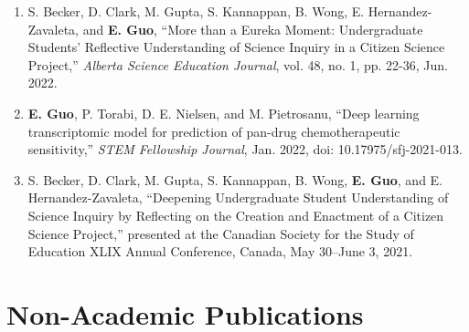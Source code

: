 \documentclass{article}
\begin{document}
\begin{enumerate}[itemsep=1em]
    \item S. Becker, D. Clark, M. Gupta, S. Kannappan, B. Wong, E. Hernandez-Zavaleta, and \textbf{E. Guo}, ``More than a Eureka Moment: Undergraduate Students' Reflective Understanding of Science Inquiry in a Citizen Science Project,'' \textit{Alberta Science Education Journal}, vol. 48, no. 1, pp. 22-36, Jun. 2022.
    \item \textbf{E. Guo}, P. Torabi, D. E. Nielsen, and M. Pietrosanu, ``Deep learning transcriptomic model for prediction of pan-drug chemotherapeutic sensitivity,'' \textit{STEM Fellowship Journal}, Jan. 2022, doi: 10.17975/sfj-2021-013.
    \item S. Becker, D. Clark, M. Gupta, S. Kannappan, B. Wong, \textbf{E. Guo}, and E. Hernandez-Zavaleta, ``Deepening Undergraduate Student Understanding of Science Inquiry by Reflecting on the Creation and Enactment of a Citizen Science Project,'' presented at the Canadian Society for the Study of Education XLIX Annual Conference, Canada, May 30--June 3, 2021.
\end{enumerate}

\section*{\textcolor{my_colour}{Non-Academic Publications}}
\vspace{-.25em} \hrulefill \vspace{.25em}
\end{document}
